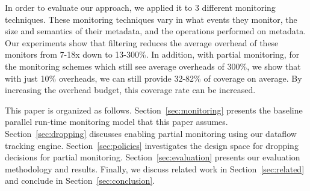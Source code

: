 In order to evaluate our approach, we applied it to 3 different monitoring
techniques. These monitoring techniques vary in what events they monitor, the
size and semantics of their metadata, and the operations performed on metadata.
Our experiments show that filtering reduces the average overhead of these
monitors from 7-18x down to 13-300\%.
In addition, with partial monitoring, for the monitoring schemes which still
see average overheads of 300\%, we show that with just 10\% overheads, we can still
provide 32-82\% of coverage on average. By increasing the
overhead budget, this coverage rate can be increased. 

This paper is organized as follows. Section~\ref{sec:monitoring} presents the
baseline parallel run-time monitoring model that this paper assumes.
Section~\ref{sec:dropping} discusses enabling partial monitoring using our dataflow tracking engine.
Section~\ref{sec:policies}
investigates the design space for dropping decisions for partial monitoring.
Section~\ref{sec:evaluation} presents our evaluation methodology and
results. Finally, we discuss related work in Section~\ref{sec:related} and
conclude in Section~\ref{sec:conclusion}.

